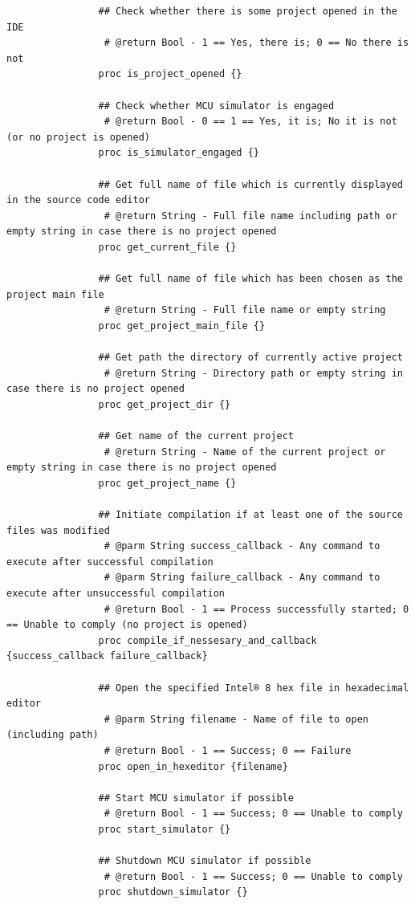 \documentclass[a4paper,twoside,12pt]{book}
\newcommand{\mysmallfont}{\fontsize{8pt}{10pt} \selectfont{}}
\begin{document}
		{
			\mysmallfont{}
			\begin{verbatim}
				## Check whether there is some project opened in the IDE
				 # @return Bool - 1 == Yes, there is; 0 == No there is not
				proc is_project_opened {}

				## Check whether MCU simulator is engaged
				 # @return Bool - 0 == 1 == Yes, it is; No it is not (or no project is opened)
				proc is_simulator_engaged {}

				## Get full name of file which is currently displayed in the source code editor
				 # @return String - Full file name including path or empty string in case there is no project opened
				proc get_current_file {}

				## Get full name of file which has been chosen as the project main file
				 # @return String - Full file name or empty string
				proc get_project_main_file {}

				## Get path the directory of currently active project
				 # @return String - Directory path or empty string in case there is no project opened
				proc get_project_dir {}

				## Get name of the current project
				 # @return String - Name of the current project or empty string in case there is no project opened
				proc get_project_name {}

				## Initiate compilation if at least one of the source files was modified
				 # @parm String success_callback - Any command to execute after successful compilation
				 # @parm String failure_callback - Any command to execute after unsuccessful compilation
				 # @return Bool - 1 == Process successfully started; 0 == Unable to comply (no project is opened)
				proc compile_if_nessesary_and_callback {success_callback failure_callback}

				## Open the specified Intel® 8 hex file in hexadecimal editor
				 # @parm String filename - Name of file to open (including path)
				 # @return Bool - 1 == Success; 0 == Failure
				proc open_in_hexeditor {filename}

				## Start MCU simulator if possible
				 # @return Bool - 1 == Success; 0 == Unable to comply
				proc start_simulator {}

				## Shutdown MCU simulator if possible
				 # @return Bool - 1 == Success; 0 == Unable to comply
				proc shutdown_simulator {}
			\end{verbatim}
		}
\end{document}
